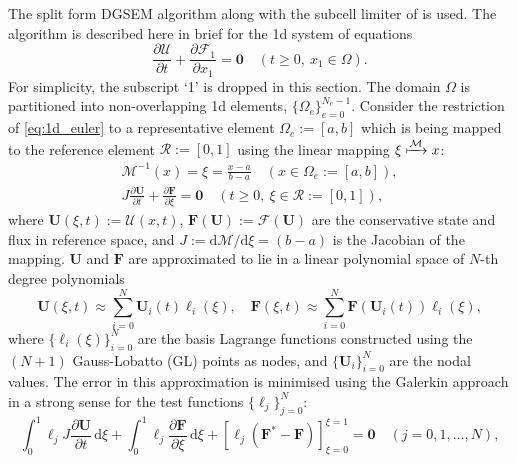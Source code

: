 \documentclass[a4paper,11pt,oneside]{article}
\newcommand{\citear}[1]{\citeauthor{#1} \cite{#1}} %
\newcommand{\vect}[1]{\ensuremath{\boldsymbol{\mathbf{#1}}}} %
\newcommand{\pder}[2]{\frac{\partial #1}{\partial #2}} %
\newcommand{\sdi}{\ensuremath{\,\text{d}}} %
\newcommand{\sdd}{\ensuremath{\text{d}}} %
\newcommand{\defeq}{\ensuremath{:=}} %
\newcommand{\refelemone}{\ensuremath{\mathcal{R}}} %
\newcommand{\elemmapone}{\ensuremath{\mathcal{M}}} %
\newcommand{\eulerphy}[1]{\ensuremath{\mathcal{#1}}} %
\newcommand{\eulerref}[1]{\ensuremath{#1}} %
\begin{document}
The split form DGSEM algorithm \cite{gassnerWintersKopriva2016} along with the subcell limiter of \citear{hennemannRamirezHindenlang2021} is used. The algorithm is described here in brief for the 1d system of equations
\begin{equation}
	\pder{\vect{\eulerphy{U}}}{t} + \pder{\vect{\eulerphy{F}}_1}{x_1} = \vect{0} \quad (t \geq 0,\ x_1 \in \Omega).
	\label{eq:1d_euler}
\end{equation}
For simplicity, the subscript `1' is dropped in this section. The domain $\Omega$ is partitioned into non-overlapping 1d elements, $\{\Omega_e\}_{e=0}^{N_e-1}$. Consider the restriction of \cref{eq:1d_euler} to a representative element $\Omega_e \defeq [a,b]$ which is being mapped to the reference element $\refelemone \defeq [0,1]$ using the linear mapping $\xi \xmapsto{\elemmapone} x$:
\begin{gather*}
	\elemmapone^{-1}(x) = \xi = \frac{x-a}{b-a} \quad (x \in \Omega_e \defeq [a,b]),
	\label{eq:1d_element_mapping}\\
	J \pder{\vect{\eulerref{U}}}{t} + \pder{\vect{\eulerref{F}}}{\xi} = \vect{0} \quad (t \geq 0,\ \xi \in \refelemone \defeq [0,1]),
	\label{eq:1d_euler_refelem}
\end{gather*}
where $\vect{\eulerref{U}}(\xi,t) \defeq \vect{\eulerphy{U}}(x,t)$, $\vect{\eulerref{F}}(\vect{\eulerref{U}}) \defeq \vect{\eulerphy{F}}(\vect{\eulerref{U}})$ are the conservative state and flux in reference space, and $J \defeq \sdd \elemmapone/\sdd \xi = (b-a)$ is the Jacobian of the mapping. $\vect{\eulerref{U}}$ and $\vect{\eulerref{F}}$ are approximated to lie in a linear polynomial space of $N$-th degree polynomials
\begin{equation*}
	\vect{\eulerref{U}}(\xi,t) \approx \sum_{i=0}^{N} \vect{\eulerref{U}}_i(t) \ell_i(\xi), \quad \eulerref{\vect{F}}(\xi,t) \approx \sum_{i=0}^{N} \eulerref{\vect{F}}(\vect{\eulerref{U}}_i(t)) \ell_i(\xi),
	\label{eq:1d_euler_state_flux_interpolation}
\end{equation*}
where $\{\ell_i(\xi)\}_{i=0}^{N}$ are the basis Lagrange functions constructed using the $(N+1)$ Gauss-Lobatto (GL) points as nodes, and $\{\vect{\eulerref{U}}_i\}_{i=0}^{N}$ are the nodal values. The error in this approximation is minimised using the Galerkin approach in a strong sense for the test functions $\{\ell_j\}_{j=0}^{N}$:
\begin{equation}
	\int_{0}^{1} \ell_j J \pder{\vect{\eulerref{U}}}{t} \sdi \xi + \int_{0}^{1} \ell_j \pder{\vect{\eulerref{F}}}{\xi} \sdi \xi + \left[\ell_j (\vect{\eulerref{F}}^*-\vect{\eulerref{F}}) \right]_{\xi=0}^{\xi=1} = \vect{0}\quad (j=0,1,\ldots,N),
	\label{eq:1d_euler_strong_form}
\end{equation}
\end{document}
